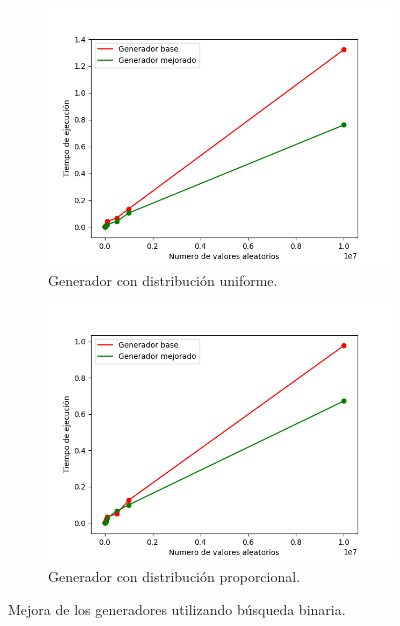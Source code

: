 \documentclass[11pt,a4paper]{report}
\begin{document}
\begin{figure}[H]
\begin{subfigure}{.5\textwidth}
	\centering
	\includegraphics[scale=0.4]{img/mejora2a.png}
	\caption{Generador con distribución uniforme.}
	\label{sub-fig:mejora2a}
\end{subfigure}
\begin{subfigure}{.5\textwidth}
	\centering
	\includegraphics[scale=0.4]{img/mejora2b.png}
	\caption{Generador con distribución proporcional.}
	\label{sub-fig:mejora2b}
\end{subfigure}
\caption{Mejora de los generadores utilizando búsqueda binaria.}
\label{fig:mejora2ab}
\end{figure}
\end{document}
